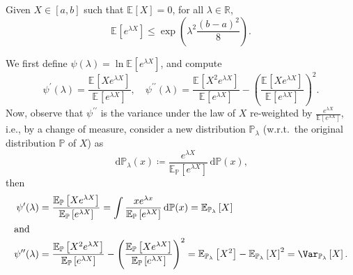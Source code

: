 \begin{answer}
	\begin{claim}
		Given \(X \in [a, b]\) such that \(\mathbb{E}_{}\left[X  \right] = 0\), for all \(\lambda \in \mathbb{R} \),
		\[
			\mathbb{E}_{}\left[e^{\lambda X} \right] \leq \exp (\lambda ^2 \frac{(b-a)^2}{8}).
		\]
	\end{claim}
	\begin{explanation}
		We first define \(\psi (\lambda ) = \ln \mathbb{E}_{}\left[e^{\lambda X} \right] \), and compute
		\[
			\psi ^{\prime} (\lambda ) = \frac{\mathbb{E}_{}\left[X e^{\lambda X} \right] }{\mathbb{E}_{}\left[e^{\lambda X} \right] },\quad
			\psi ^{\prime\prime} (\lambda ) = \frac{\mathbb{E}_{}\left[X^2 e^{\lambda X} \right] }{\mathbb{E}_{}\left[e^{\lambda X} \right] } - \left( \frac{\mathbb{E}_{}\left[X e^{\lambda X} \right] }{\mathbb{E}_{}\left[e^{\lambda X} \right] } \right) ^2.
		\]
		Now, observe that \(\psi ^{\prime\prime} \) is the variance under the law of \(X\) re-weighted by \(\frac{e^{\lambda X}}{\mathbb{E}_{}\left[e^{\lambda X} \right] }\), i.e., by a change of measure, consider a new distribution \(\mathbb{P} _\lambda \) (w.r.t.\ the original distribution \(\mathbb{P} \) of \(X\)) as
		\[
			\,\mathrm{d} \mathbb{P} _\lambda (x) \coloneqq \frac{e^{\lambda X}}{\mathbb{E}_{\mathbb{P} }\left[e^{\lambda X} \right] }\,\mathrm{d} \mathbb{P} (x),
		\]
		then
		\begin{align*}
			\psi ^{\prime} (\lambda )
			 & = \frac{\mathbb{E}_{\mathbb{P} }\left[X e^{\lambda X} \right] }{\mathbb{E}_{\mathbb{P} }\left[e^{\lambda X} \right] }
			= \int \frac{x e^{\lambda x}}{\mathbb{E}_{\mathbb{P} }\left[ e^{\lambda X}\right] } \,\mathrm{d} \mathbb{P} (x)
			= \mathbb{E}_{\mathbb{P} _\lambda }\left[ X \right]                                                                                                                                                                                                                   \\
			\shortintertext{and}
			\psi ^{\prime\prime} (\lambda )
			 & = \frac{\mathbb{E}_{\mathbb{P} }\left[ X^2 e^{\lambda X} \right] }{\mathbb{E}_{\mathbb{P} }\left[ e^{\lambda X} \right] } - \left( \frac{\mathbb{E}_{\mathbb{P} }\left[ X e^{\lambda X} \right] }{\mathbb{E}_{\mathbb{P} }\left[ e^{\lambda X}\right] } \right) ^2
			= \mathbb{E}_{\mathbb{P} _\lambda }\left[ X^2 \right] - \mathbb{E}_{\mathbb{P} _\lambda }\left[ X \right] ^2
			= \Var_{\mathbb{P} _\lambda }\left[X \right] .
		\end{align*}


\end{explanation}
\end{answer}
